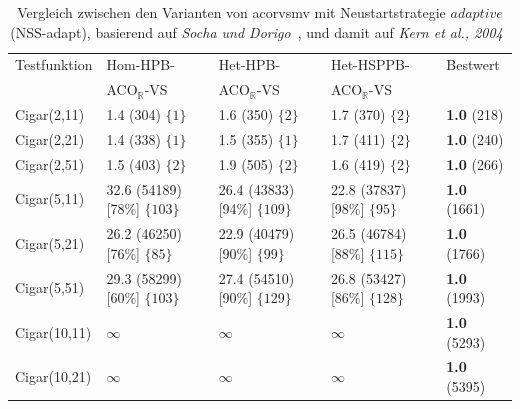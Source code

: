 \documentclass[fontsize=12, a4aper]{scrartcl}
\begin{document}
	\begin{table}[H]
		
		\caption{Vergleich zwischen den Varianten von \acl{acorvsmv} mit Neustartstrategie \(adaptive\) (NSS-adapt), basierend auf \textit{Socha und Dorigo}~\cite{socha2008ant}, und damit auf \textit{Kern et al., 2004}~\cite{kern2004learning}}
		
		\label{subsec:Vergleich_Von_ACO_R_ACO_R_Very_Simple_Und_Iterationen:tab:Vergleich_Probabilistisches_Lernen_Funktionen_Mit_Gemischten_Variablen_Teil_2}
		
		\scriptsize
		
		\begin{tabularx}{\linewidth}{l l l l l}

			\toprule
			
			Testfunktion & Hom-HPB- & Het-HPB- & Het-HSPPB- & Bestwert\\
			
			& ACO\(_\mathbb{R}\)-VS & ACO\(_\mathbb{R}\)-VS & ACO\(_\mathbb{R}\)-VS & \\
			
			\midrule
			
			Cigar(2,11) & 1.4 (304) \(\{1\}\) & 1.6 (350) \(\{2\}\) & 1.7 (370) \(\{2\}\) & \textbf{1.0} (218)\\
			
			Cigar(2,21) & 1.4 (338) \(\{1\}\) & 1.5 (355) \(\{1\}\) & 1.7 (411) \(\{2\}\) & \textbf{1.0} (240)\\
			
			Cigar(2,51) & 1.5 (403) \(\{2\}\) & 1.9 (505) \(\{2\}\) & 1.6 (419) \(\{2\}\) & \textbf{1.0} (266)\\
			
			Cigar(5,11) & 32.6 (54189) [78\%] \(\{103\}\) & 26.4 (43833) [94\%] \(\{109\}\) & 22.8 (37837) [98\%] \(\{95\}\) & \textbf{1.0} (1661)\\
			
			Cigar(5,21) & 26.2 (46250) [76\%] \(\{85\}\) & 22.9 (40479) [90\%] \(\{99\}\) & 26.5 (46784) [88\%] \(\{115\}\) & \textbf{1.0} (1766)\\
			
			Cigar(5,51) & 29.3 (58299) [60\%] \(\{103\}\) & 27.4 (54510) [90\%] \(\{129\}\) & 26.8 (53427) [86\%] \(\{128\}\) & \textbf{1.0} (1993)\\	
			
			Cigar(10,11) & \(\infty\) & \(\infty\) & \(\infty\) & \textbf{1.0} (5293)\\
			
			Cigar(10,21) & \(\infty\) & \(\infty\) & \(\infty\) & \textbf{1.0} (5395)\\
			

\end{tabularx}
\end{table}
\end{document}
